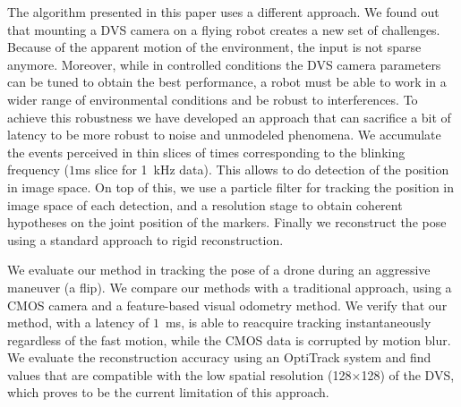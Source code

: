 The algorithm presented in this paper uses a different approach. We
found out that mounting a DVS camera on a flying robot creates a new
set of challenges. Because of the apparent motion of the environment,
the input is not sparse anymore. Moreover, while in controlled conditions
the DVS camera parameters can be tuned to obtain the best performance,
a robot must be able to work in a wider range of environmental conditions
and be robust to interferences. To achieve this robustness we have
developed an approach that can sacrifice a bit of latency to be more
robust to noise and unmodeled phenomena. We accumulate the events
perceived in thin slices of times corresponding to the blinking frequency
($1$ms slice for 1~kHz data). This allows to do detection of the
\ALMs position in image space. On top of this, we use a particle
filter for tracking the position in image space of each detection,
and a resolution stage to obtain coherent hypotheses on the joint
position of the markers. Finally we reconstruct the pose using a standard
approach to rigid reconstruction.

We evaluate our method in tracking the pose of a drone during an aggressive
maneuver (a flip). We compare our methods with a traditional approach,
using a CMOS camera and a feature-based visual odometry method. We
verify that our method, with a latency of $1$~ms, is able to reacquire
tracking instantaneously regardless of the fast motion, while the
CMOS data is corrupted by motion blur. We evaluate the reconstruction
accuracy using an OptiTrack system and find values that are compatible
with the low spatial resolution (128$\times$128) of the DVS, which
proves to be the current limitation of this approach.

